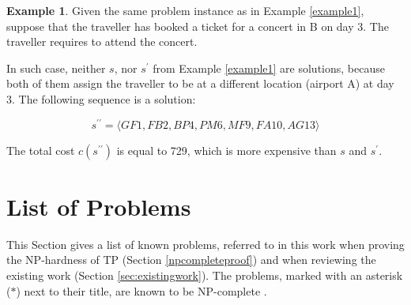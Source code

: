 \documentclass{mprop}
\theoremstyle{definition}
\newtheorem{example}{Example}
\begin{document}
\begin{example}
\label{example2}
Given the same problem instance as in Example \ref{example1}, suppose that the traveller has booked a ticket for a concert in B on day 3. The traveller requires to attend the concert.
\end{example}

\begin{solution}
In such case, neither $s$, nor $s^{\prime}$ from Example \ref{example1} are solutions, because both of them assign the traveller to be at a different location (airport A) at day 3. The following sequence is a solution:

$$ s^{\prime\prime} = \langle GF1, FB2, BP4, PM6, MF9, FA10, AG13\rangle $$

The total cost $c(s^{\prime\prime})$ is equal to 729, which is more expensive than $s$ and $s^{\prime}$.
\end{solution}

\section{List of Problems}
\label{npcompleteproblems}

This Section gives a list of known problems, referred to in this work when proving the NP-hardness of TP (Section \ref{npcompleteproof}) and when reviewing the existing work (Section \ref{sec:existingwork}). The problems, marked with an asterisk ($\ast$) next to their title, are known to be NP-complete \citep{thebible}.
\end{document}
